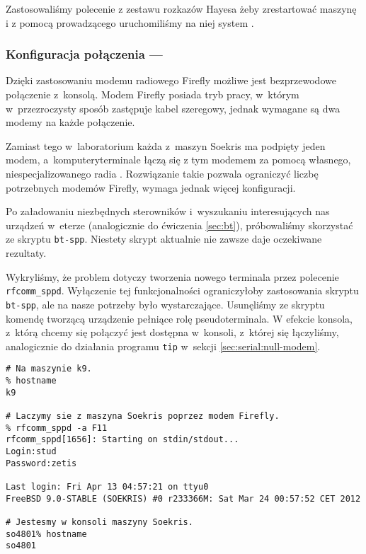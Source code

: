 Zastosowaliśmy polecenie z zestawu rozkazów Hayesa żeby zrestartować maszynę
\zielone{} i z pomocą prowadzącego uruchomiliśmy na niej system \bsd.

\subsubsection{Konfiguracja połączenia --- \bt}

Dzięki zastosowaniu modemu radiowego Firefly możliwe jest bezprzewodowe
połączenie z~konsolą. Modem Firefly posiada tryb pracy, w~którym w~przezroczysty
sposób zastępuje kabel szeregowy, jednak wymagane są dwa modemy na każde
połączenie.

Zamiast tego w~laboratorium każda z~maszyn Soekris ma podpięty jeden modem,
a~komputery\dywiz terminale łączą się z tym modemem za pomocą własnego,
niespecjalizowanego radia \bt. Rozwiązanie takie pozwala ograniczyć liczbę
potrzebnych modemów Firefly, wymaga jednak więcej konfiguracji.

Po załadowaniu niezbędnych sterowników i~wyszukaniu interesujących nas urządzeń
w~eterze (analogicznie do ćwiczenia \ref{sec:bt}), próbowaliśmy skorzystać ze
skryptu \texttt{bt-spp}. Niestety skrypt aktualnie nie zawsze daje oczekiwane
rezultaty.

Wykryliśmy, że problem dotyczy tworzenia nowego terminala przez polecenie
\texttt{rfcomm\_sppd}. Wyłączenie tej funkcjonalności ograniczyłoby zastosowania
skryptu \texttt{bt-spp}, ale na nasze potrzeby było wystarczające. Usunęliśmy ze
skryptu komendę tworzącą urządzenie pełniące rolę pseudo\dywiz terminala. W
efekcie konsola, z~którą chcemy się połączyć jest dostępna w~konsoli, z~której
się łączyliśmy, analogicznie do działania programu \texttt{tip} w~sekcji
\ref{sec:serial:null-modem}.

\begin{lstlisting}[caption={Połączenie z konsolą za pomocą programu \texttt{rfcomm\_sppd}.}]
# Na maszynie k9.
% hostname
k9

# Laczymy sie z maszyna Soekris poprzez modem Firefly.
% rfcomm_sppd -a F11
rfcomm_sppd[1656]: Starting on stdin/stdout...
Login:stud
Password:zetis

Last login: Fri Apr 13 04:57:21 on ttyu0
FreeBSD 9.0-STABLE (SOEKRIS) #0 r233366M: Sat Mar 24 00:57:52 CET 2012

# Jestesmy w konsoli maszyny Soekris.
so4801% hostname
so4801
\end{lstlisting}
